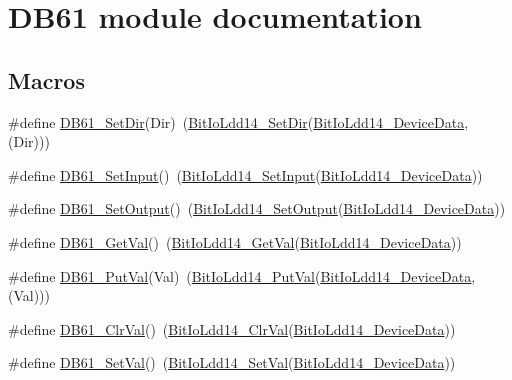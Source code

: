 \hypertarget{group___d_b61__module}{}\section{D\+B61 module documentation}
\label{group___d_b61__module}
\subsection*{Macros}
\begin{DoxyCompactItemize}
\item 
\#define \hyperlink{group___d_b61__module_gac843762a13f4003ebb4afd75094db66d}{D\+B61\+\_\+\+Set\+Dir}(Dir)~(\hyperlink{group___bit_io_ldd14__module_ga355321bc14f2b7d48f987262e47ec774}{Bit\+Io\+Ldd14\+\_\+\+Set\+Dir}(\hyperlink{group___bit_io_ldd14__module_ga73f5611a097a03f5f36a403f6b6e9fff}{Bit\+Io\+Ldd14\+\_\+\+Device\+Data}, (Dir)))
\item 
\#define \hyperlink{group___d_b61__module_ga74ea0e3e995e69774dcb2e39d82d3937}{D\+B61\+\_\+\+Set\+Input}()~(\hyperlink{group___bit_io_ldd14__module_gaa57898006e1c42d880e2a66dbcaecae7}{Bit\+Io\+Ldd14\+\_\+\+Set\+Input}(\hyperlink{group___bit_io_ldd14__module_ga73f5611a097a03f5f36a403f6b6e9fff}{Bit\+Io\+Ldd14\+\_\+\+Device\+Data}))
\item 
\#define \hyperlink{group___d_b61__module_ga49d3c58b27d0ca6730264d9e17f4ac00}{D\+B61\+\_\+\+Set\+Output}()~(\hyperlink{group___bit_io_ldd14__module_ga92faf92eda5aee7a1ee9aae450d3b062}{Bit\+Io\+Ldd14\+\_\+\+Set\+Output}(\hyperlink{group___bit_io_ldd14__module_ga73f5611a097a03f5f36a403f6b6e9fff}{Bit\+Io\+Ldd14\+\_\+\+Device\+Data}))
\item 
\#define \hyperlink{group___d_b61__module_ga861966b3bcc2c67f3e5a43a7cabfa880}{D\+B61\+\_\+\+Get\+Val}()~(\hyperlink{group___bit_io_ldd14__module_gaafad119c3f5eaac56fbe423465ad25de}{Bit\+Io\+Ldd14\+\_\+\+Get\+Val}(\hyperlink{group___bit_io_ldd14__module_ga73f5611a097a03f5f36a403f6b6e9fff}{Bit\+Io\+Ldd14\+\_\+\+Device\+Data}))
\item 
\#define \hyperlink{group___d_b61__module_ga59fb5afe534d6fe5735fce6272c8b4ad}{D\+B61\+\_\+\+Put\+Val}(Val)~(\hyperlink{group___bit_io_ldd14__module_ga5b43e570ab8bb71e3fb5dcbfdfb5f5f6}{Bit\+Io\+Ldd14\+\_\+\+Put\+Val}(\hyperlink{group___bit_io_ldd14__module_ga73f5611a097a03f5f36a403f6b6e9fff}{Bit\+Io\+Ldd14\+\_\+\+Device\+Data}, (Val)))
\item 
\#define \hyperlink{group___d_b61__module_gae990023c7ad8df6392831485b815d767}{D\+B61\+\_\+\+Clr\+Val}()~(\hyperlink{group___bit_io_ldd14__module_ga3525e52f161a7a507fa5cbb80ddc5c60}{Bit\+Io\+Ldd14\+\_\+\+Clr\+Val}(\hyperlink{group___bit_io_ldd14__module_ga73f5611a097a03f5f36a403f6b6e9fff}{Bit\+Io\+Ldd14\+\_\+\+Device\+Data}))
\item 
\#define \hyperlink{group___d_b61__module_ga794b427c7a45cf554609a590981197ea}{D\+B61\+\_\+\+Set\+Val}()~(\hyperlink{group___bit_io_ldd14__module_gafc0efe9c15e9975b1707af654e976785}{Bit\+Io\+Ldd14\+\_\+\+Set\+Val}(\hyperlink{group___bit_io_ldd14__module_ga73f5611a097a03f5f36a403f6b6e9fff}{Bit\+Io\+Ldd14\+\_\+\+Device\+Data}))
\end{DoxyCompactItemize}


